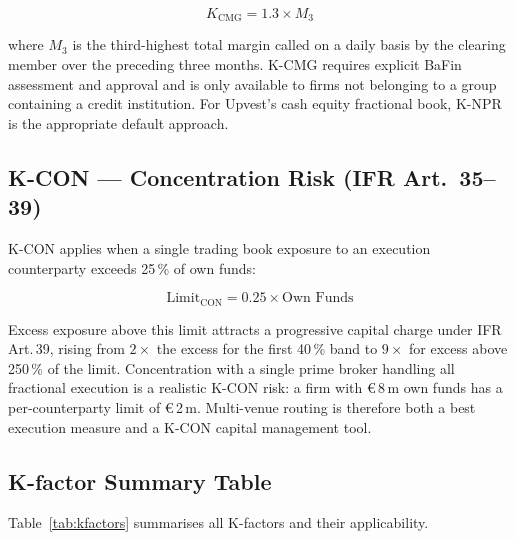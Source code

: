 \documentclass[12pt,a4paper]{report}
\newcommand{\eur}{\euro\,}
\begin{document}
\begin{equation}
  K_{\text{CMG}} = 1.3 \times M_{3}
  \label{eq:kcmg}
\end{equation}

where $M_{3}$ is the third-highest total margin called on a daily basis by the
clearing member over the preceding three months. K-CMG requires explicit BaFin
assessment and approval and is only available to firms not belonging to a group
containing a credit institution. For Upvest's cash equity fractional book,
K-NPR is the appropriate default approach.

\subsection{K-CON --- Concentration Risk (IFR Art.\ 35--39)}

K-CON applies when a single trading book exposure to an execution counterparty exceeds
25\,\% of own funds:

\begin{equation}
  \text{Limit}_{\text{CON}} = 0.25 \times \text{Own Funds}
  \label{eq:kcon}
\end{equation}

Excess exposure above this limit attracts a progressive capital charge under
IFR\,Art.\,39, rising from $2\times$ the excess for the first 40\,\% band to
$9\times$ for excess above 250\,\% of the limit. Concentration with a single prime
broker handling all fractional execution is a realistic K-CON risk: a firm with
\eur{}8\,m own funds has a per-counterparty limit of \eur{}2\,m. Multi-venue routing
is therefore both a best execution measure and a K-CON capital management tool.

\subsection{K-factor Summary Table}

Table~\ref{tab:kfactors} summarises all K-factors and their applicability.
\end{document}
